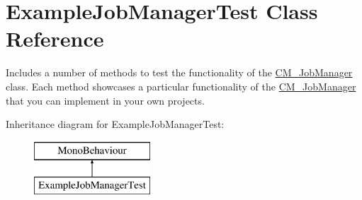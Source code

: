 \hypertarget{class_example_job_manager_test}{}\section{Example\+Job\+Manager\+Test Class Reference}
\label{class_example_job_manager_test}


Includes a number of methods to test the functionality of the \hyperlink{class_c_m___job_manager}{C\+M\+\_\+\+Job\+Manager} class. Each method showcases a particular functionality of the \hyperlink{class_c_m___job_manager}{C\+M\+\_\+\+Job\+Manager} that you can implement in your own projects.  


Inheritance diagram for Example\+Job\+Manager\+Test\+:\begin{figure}[H]
\begin{center}
\leavevmode
\includegraphics[height=2.000000cm]{class_example_job_manager_test}
\end{center}
\end{figure}
